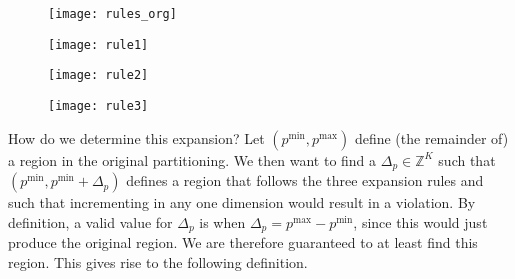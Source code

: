 \begin{figure*}[ht]
    \centering
    \begin{subfigure}{0.24\textwidth}
        \texttt{[image: rules\_org]}%
        \caption{}%
        \label{fig:expRulesOrg}
    \end{subfigure}
    \begin{subfigure}{0.24\textwidth}
      \texttt{[image: rule1]}%
      \caption{}%
      \label{fig:expRules1}
    \end{subfigure}
    \begin{subfigure}{0.24\textwidth}
      \texttt{[image: rule2]}%
      \caption{}%
      \label{fig:expRules2}
    \end{subfigure}
    \begin{subfigure}{0.24\textwidth}
      \texttt{[image: rule3]}%
      \caption{}%
      \label{fig:expRules3}
    \end{subfigure}

  \caption{%
      A visual example of the 3 expansion rules. Striped regions indicate that
      the algorithm has covered this part in a previous iteration, whereas the
      shaded region with a dashed border is a candidate expanded
      region.~\cref{fig:expRulesOrg} shows a potential input partitioning.
      In~\cref{fig:expRules1} the expansion is illegal according to Rule 1,
      since the expanded region contains two different actions
      (colors).~\cref{fig:expRules2} violates Rule 2, since the expanded region
      overlaps with a striped area.~\cref{fig:expRules3} shows a representation
      of the 3rd rule, as the expansion would `cut' the rightmost region in two.
  }%
  \label{fig:expansionRules}
\end{figure*}


How do we determine this expansion? Let $(p^{\min}, p^{\max})$ define (the
remainder of) a region in the original partitioning. We then want to find a
$\Delta_p \in \mathbb{Z}^K$ such that $(p^{\min}, p^{\min} + \Delta_p)$ defines
a region that follows the three expansion rules and such that incrementing in
any one dimension would result in a violation. By definition, a valid value for
$\Delta_p$ is when $\Delta_p = p^{\max} - p^{\min}$, since this would just
produce the original region. We are therefore guaranteed to at least find this
region. This gives rise to the following definition.


